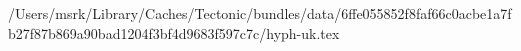 /Users/msrk/Library/Caches/Tectonic/bundles/data/6ffe055852f8faf66c0acbe1a7fb27f87b869a90bad1204f3bf4d9683f597c7c/hyph-uk.tex